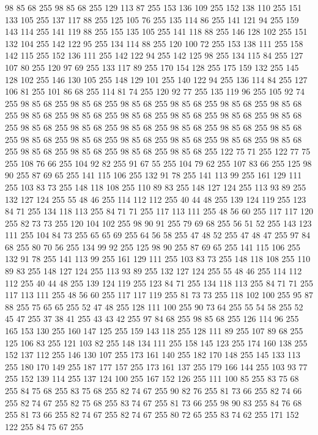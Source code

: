 98 85 68 255 98 85 68 255 129 113 87 255 153 136 109 255 152 138 110 255 151 133 105 255 137 117 88 255 125 105 76 255 135 114 86 255 141 121 94 255 159 143 114 255 141 119 88 255 155 135 105 255 141 118 88 255 146 128 102 255 151 132 104 255 142 122 95 255 134 114 88 255 120 100 72 255 153 138 111 255 158 142 115 255 152 136 111 255 142 122 94 255 142 125 98 255 134 115 84 255 127 107 80 255 120 97 69 255 133 117 89 255 170 154 128 255 175 159 132 255 145 128 102 255 146 130 105 255 148 129 101 255 140 122 94 255 136 114 84 255 127 106 81 255 101 86 68 255 114 81 74 255 120 92 77 255 135 119 96 255 105 92 74 255 98 85 68 255 98 85 68 255 98 85 68 255 98 85 68 255 98 85 68 255 98 85 68 255 98 85 68 255 98 85 68 255 98 85 68 255 98 85 68 255 98 85 68 255 98 85 68 255 98 85 68 255 98 85 68 255 98 85 68 255 98 85 68 255 98 85 68 255 98 85 68 255 98 85 68 255 98 85 68 255 98 85 68 255 98 85 68 255 98 85 68 255
98 85 68 255 98 85 68 255 98 85 68 255 98 85 68 255 98 85 68 255 122 75 71 255 122 77 75 255 108 76 66 255 104 92 82 255 91 67 55 255 104 79 62 255 107 83 66 255 125 98 90 255 87 69 65 255 141 115 106 255 132 91 78 255 141 113 99 255 161 129 111 255 103 83 73 255 148 118 108 255 110 89 83 255 148 127 124 255 113 93 89 255 132 127 124 255 55 48 46 255 114 112 112 255 40 44 48 255 139 124 119 255 123 84 71 255 134 118 113 255 84 71 71 255 117 113 111 255 48 56 60 255 117 117 120 255 82 73 73 255 120 104 102 255 98 90 91 255 79 69 68 255 56 51 52 255 143 123 111 255 104 84 73 255 65 65 69 255 64 56 58 255 47 48 52 255 47 48 47 255 97 84 68 255 80 70 56 255 134 99 92 255 125 98 90 255 87 69 65 255 141 115 106 255 132 91 78 255 141 113 99 255 161 129 111 255 103 83 73 255 148 118 108 255 110 89 83 255 148 127 124 255 113 93 89 255 132 127 124 255 55 48 46 255 114 112 112 255 40 44 48 255 139 124 119 255
123 84 71 255 134 118 113 255 84 71 71 255 117 113 111 255 48 56 60 255 117 117 119 255 81 73 73 255 118 102 100 255 95 87 88 255 75 65 65 255 52 47 48 255 128 111 100 255 90 73 64 255 55 54 58 255 52 45 47 255 37 38 41 255 43 43 42 255 97 84 68 255 98 85 68 255 126 114 96 255 165 153 130 255 160 147 125 255 159 143 118 255 128 111 89 255 107 89 68 255 125 106 83 255 121 103 82 255 148 134 111 255 158 145 123 255 174 160 138 255 152 137 112 255 146 130 107 255 173 161 140 255 182 170 148 255 145 133 113 255 180 170 149 255 187 177 157 255 173 161 137 255 179 166 144 255 103 93 77 255 152 139 114 255 137 124 100 255 167 152 126 255 111 100 85 255 83 75 68 255 84 75 68 255 83 75 68 255 82 74 67 255 90 82 76 255 81 73 66 255 82 74 66 255 82 74 67 255 82 75 68 255 83 74 67 255 81 73 66 255 98 90 83 255 84 76 68 255 81 73 66 255 82 74 67 255 82 74 67 255 80 72 65 255 83 74 62 255 171 152 122 255 84 75 67 255
